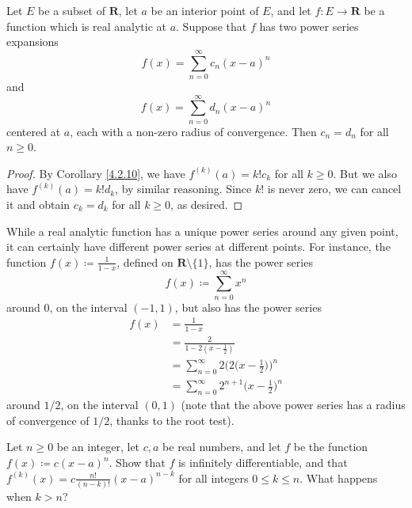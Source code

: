 \begin{corollary}\label{4.2.12}
    Let \(E\) be a subset of \(\mathbf{R}\), let \(a\) be an interior point of \(E\), and let \(f : E \to \mathbf{R}\) be a function which is real analytic at \(a\).
    Suppose that \(f\) has two power series expansions
    \[
        f(x) = \sum_{n = 0}^\infty c_n (x - a)^n
    \]
    and
    \[
        f(x) = \sum_{n = 0}^\infty d_n (x - a)^n
    \]
    centered at \(a\), each with a non-zero radius of convergence.
    Then \(c_n = d_n\) for all \(n \geq 0\).
\end{corollary}

\begin{proof}
    By Corollary \ref{4.2.10}, we have \(f^{(k)}(a) = k! c_k\) for all \(k \geq 0\).
    But we also have \(f^{(k)}(a) = k! d_k\), by similar reasoning.
    Since \(k!\) is never zero, we can cancel it and obtain \(c_k = d_k\) for all \(k \geq 0\), as desired.
\end{proof}

\begin{remark}\label{4.2.13}
    While a real analytic function has a unique power series around any given point, it can certainly have different power series at different points.
    For instance, the function \(f(x) \coloneqq \frac{1}{1 - x}\), defined on \(\mathbf{R} \setminus \{1\}\), has the power series
    \[
        f(x) \coloneqq \sum_{n = 0}^\infty x^n
    \]
    around \(0\), on the interval \((-1, 1)\), but also has the power series
    \begin{align*}
        f(x) & = \frac{1}{1 - x}                                                  \\
             & = \frac{2}{1 - 2(x - \frac{1}{2})}                                 \\
             & = \sum_{n = 0}^\infty 2 \bigg(2\bigg(x - \frac{1}{2}\bigg)\bigg)^n \\
             & = \sum_{n = 0}^\infty 2^{n + 1} \bigg(x - \frac{1}{2}\bigg)^n
    \end{align*}
    around \(1 / 2\), on the interval \((0, 1)\)
    (note that the above power series has a radius of convergence of \(1 / 2\), thanks to the root test).
\end{remark}

\exercisesection

\begin{exercise}\label{ex 4.2.1}
    Let \(n \geq 0\) be an integer, let \(c, a\) be real numbers, and let \(f\) be the function \(f(x) \coloneqq c (x - a)^n\).
    Show that \(f\) is infinitely differentiable, and that \(f^{(k)}(x) = c \frac{n!}{(n - k)!} (x - a)^{n - k}\) for all integers \(0 \leq k \leq n\).
    What happens when \(k > n\)?
\end{exercise}

